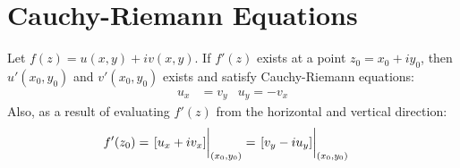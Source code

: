 \documentclass[12pt, english]{book}
\begin{document}
	
	\section{Cauchy-Riemann Equations} \label{Cauchy-Riemann Equations Section - Complex}
	\begin{theorem}
		\label{Cauchy-Riemann Equations (Cartesian) Theorem - Complex}
		Let \( f(z) = u(x, y) + iv(x,y) \).
		If \(f'(z)\) exists at a point \(z_0 = x_0 + iy_0\), then \(u'(x_0, y_0)\) and \(v'(x_0, y_0)\) exists and satisfy Cauchy-Riemann equations:
		\begin{align*}
			u_x &= v_y	&	u_y = -v_x
		\end{align*}
		Also, as a result of evaluating \(f'(z)\) from the horizontal and vertical direction:
		\begin{align*}
			f'(z_0) &= \eval{[u_x + iv_x]}_{(x_0, y_0)} 
					 = \eval{[v_y - i u_y]}_{(x_0, y_0)}
		\end{align*}
	\end{theorem}
\end{document}
